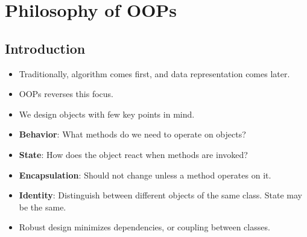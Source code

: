 \documentclass[a4paper]{article}
\begin{document}
\section{Philosophy of OOPs}
\subsection{Introduction}
\begin{itemize}
    \item Traditionally, algorithm comes first, and data representation comes later.
    \item OOPs reverses this focus.
    \item We design objects with few key points in mind.
    \item \textbf{Behavior}: What methods do we need to operate on objects?
    \item \textbf{State}: How does the object react when methods are invoked?
    \item \textbf{Encapsulation}: Should not change unless a method operates on it.
    \item \textbf{Identity}: Distinguish between different objects of the same class. State may be the same.
    \item Robust design minimizes dependencies, or coupling between classes.
\end{itemize}
\end{document}
